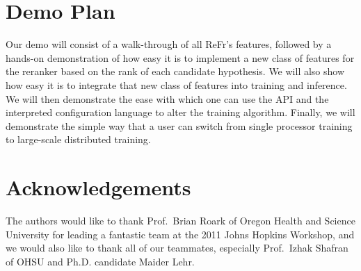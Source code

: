 \documentclass[a4paper]{article}
\begin{document}
\section{Demo Plan}
Our demo will consist of a walk-through of all ReFr's features, followed by a hands-on demonstration of how easy it is to implement a new class of features for the reranker based on the rank of each candidate hypothesis.  We will also show how easy it is to integrate that new class of features into training and inference.  We will then demonstrate the ease with which one can use the API and the interpreted configuration language to alter the training algorithm.  Finally, we will demonstrate the simple way that a user can switch from single processor training to large-scale distributed training.

\section{Acknowledgements}
The authors would like to thank Prof.\ Brian Roark of Oregon Health and
Science University for leading a fantastic team at the 2011 Johns
Hopkins Workshop, and we would also like to thank all of our teammates, especially Prof.~Izhak Shafran of OHSU and Ph.D. candidate Maider Lehr.

\newpage
%
\eightpt


\end{document}
